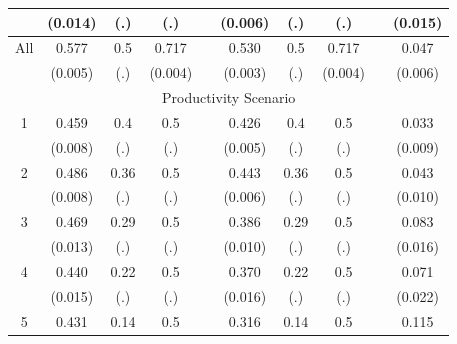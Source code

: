\documentclass[smallcondensed]{svjour3}
\begin{document}
\begin{table}
{\begin{tabularx}{13.5cm}{cccccccccc}
          & (0.014)               & (.)            &  (.)              &   & (0.006)               &  (.)            & (.)             &   & (0.015)           \\\hline
   All    &  0.577                & 0.5\sym{***}   &  0.717\sym{***}   &   &  0.530                &  0.5\sym{***}   & 0.717\sym{***}  &   &  0.047\sym{***}   \\
          & (0.005)               & (.)            & (0.004)           &   & (0.003)               &  (.)            & (0.004)         &   & (0.006)           \\\hline\hline
   \multicolumn{10}{c}{Productivity Scenario}                                                                                                                  \\
   1      &  0.459                & 0.4\sym{***}   &  0.5\sym{***}     &   &  0.426                &  0.4\sym{***}   & 0.5\sym{***}    &   &  0.033\sym{***}   \\
          & (0.008)               & (.)            &  (.)              &   & (0.005)               &  (.)            & (.)             &   & (0.009)           \\
   2      &  0.486                & 0.36\sym{***}  &  0.5\sym{**}      &   &  0.443                &  0.36\sym{***}  & 0.5\sym{***}    &   &  0.043\sym{***}   \\
          & (0.008)               & (.)            &  (.)              &   & (0.006)               &  (.)            & (.)             &   & (0.010)           \\
   3      &  0.469                & 0.29\sym{***}  &  0.5\sym{***}     &   &  0.386                &  0.29\sym{***}  & 0.5\sym{***}    &   &  0.083\sym{***}   \\
          & (0.013)               & (.)            &  (.)              &   & (0.010)               &  (.)            & (.)             &   & (0.016)           \\
   4      &  0.440                & 0.22\sym{***}  &  0.5\sym{***}     &   &  0.370                &  0.22\sym{***}  & 0.5\sym{***}    &   &  0.071\sym{***}   \\
          & (0.015)               & (.)            &  (.)              &   & (0.016)               &  (.)            & (.)             &   & (0.022)           \\
   5      &  0.431                & 0.14\sym{***}  &  0.5\sym{***}     &   &  0.316                &  0.14\sym{***}  & 0.5\sym{***}    &   &  0.115\sym{***}   \\

\end{tabularx}}
\end{table}
\end{document}
